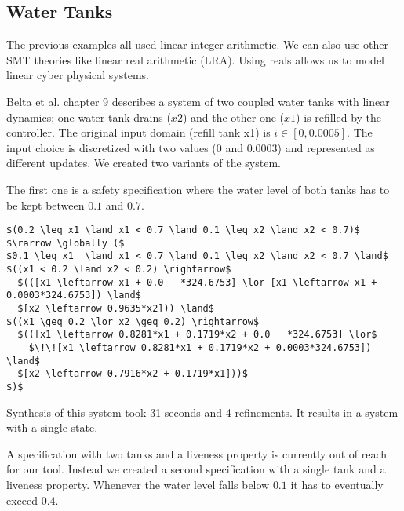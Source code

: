 \documentclass[runningheads]{llncs}
\newcommand{\globally}{\operatorname{\mathbf{G}}}
\newcommand{\rarrow}{\boldsymbol{\rightarrow}}
\begin{document}
\subsection{Water Tanks}
The previous examples all used linear integer arithmetic.
We can also use other SMT theories like linear real arithmetic (LRA).
Using reals allows us to model linear cyber physical systems.


Belta et al. \cite{belta2017} chapter 9 describes a system of two coupled water tanks with linear dynamics; one water tank drains ($x2$) and the other one ($x1$) is refilled by the controller. The original input domain (refill tank x1) is $i \in [0,0.0005]$.
The input choice is discretized with two values ($0$ and $0.0003$) and represented as different updates.
We created two variants of the system.

The first one is a safety specification where the water level of both tanks has to be kept between $0.1$ and $0.7$.
\begin{lstlisting}[mathescape=true]
$(0.2 \leq x1 \land x1 < 0.7 \land 0.1 \leq x2 \land x2 < 0.7)$
$\rarrow \globally ($
$0.1 \leq x1  \land x1 < 0.7 \land 0.1 \leq x2 \land x2 < 0.7 \land$
$((x1 < 0.2 \land x2 < 0.2) \rightarrow$
  $(([x1 \leftarrow x1 + 0.0   *324.6753] \lor [x1 \leftarrow x1 + 0.0003*324.6753]) \land$
  $[x2 \leftarrow 0.9635*x2])) \land$
$((x1 \geq 0.2 \lor x2 \geq 0.2) \rightarrow$
  $(([x1 \leftarrow 0.8281*x1 + 0.1719*x2 + 0.0   *324.6753] \lor$
    $\!\![x1 \leftarrow 0.8281*x1 + 0.1719*x2 + 0.0003*324.6753]) \land$
  $[x2 \leftarrow 0.7916*x2 + 0.1719*x1]))$
$)$
\end{lstlisting}

Synthesis of this system took 31 seconds and 4 refinements. It results in a system with a single state.

A specification with two tanks and a liveness property is currently out of reach for our tool.
Instead we created a second specification with a single tank and a liveness property.
Whenever the water level falls below $0.1$ it has to eventually exceed $0.4$.

\end{document}
